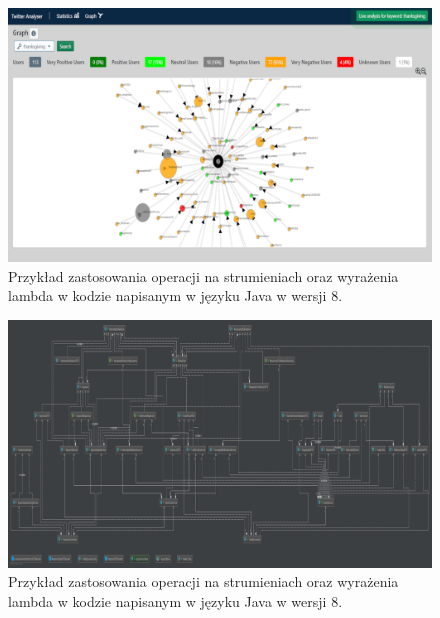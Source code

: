 \begin{figure}[h] %
	\centering
	\includegraphics[width=1.0\linewidth]{img/twitter_analyser_thanks_giving_1}
	\caption{Przykład zastosowania operacji na strumieniach oraz wyrażenia lambda w kodzie napisanym w języku Java w wersji 8.}
\end{figure}

\begin{figure}[h] %
	\centering
	\includegraphics[width=1.5\linewidth, angle=90]{img/twitter_analyser_class_diagram}
	\caption{Przykład zastosowania operacji na strumieniach oraz wyrażenia lambda w kodzie napisanym w języku Java w wersji 8.}
\end{figure}


